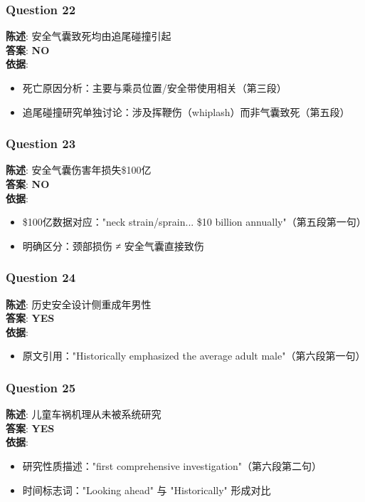 \documentclass{article}
\begin{document}
\subsubsection*{Question 22}
\textbf{陈述}: 安全气囊致死均由追尾碰撞引起 \\
\textbf{答案}: \textbf{NO} \\
\textbf{依据}:
\begin{itemize}
    \item 死亡原因分析：主要与乘员位置/安全带使用相关（第三段）
    \item 追尾碰撞研究单独讨论：涉及挥鞭伤（whiplash）而非气囊致死（第五段）
\end{itemize}

\subsubsection*{Question 23}
\textbf{陈述}: 安全气囊伤害年损失\$100亿 \\
\textbf{答案}: \textbf{NO} \\
\textbf{依据}:
\begin{itemize}
    \item \$100亿数据对应："neck strain/sprain... \$10 billion annually"（第五段第一句）
    \item 明确区分：颈部损伤 ≠ 安全气囊直接致伤
\end{itemize}

\subsubsection*{Question 24}
\textbf{陈述}: 历史安全设计侧重成年男性 \\
\textbf{答案}: \textbf{YES} \\
\textbf{依据}:
\begin{itemize}
    \item 原文引用："Historically emphasized the average adult male"（第六段第一句）
\end{itemize}

\subsubsection*{Question 25}
\textbf{陈述}: 儿童车祸机理从未被系统研究 \\
\textbf{答案}: \textbf{YES} \\
\textbf{依据}:
\begin{itemize}
    \item 研究性质描述："first comprehensive investigation"（第六段第二句）
    \item 时间标志词："Looking ahead" 与 "Historically" 形成对比
\end{itemize}
\end{document}
